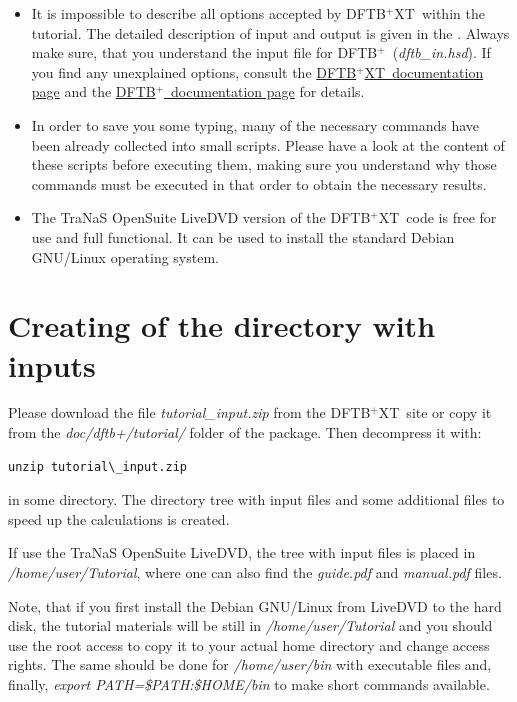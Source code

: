 \documentclass[a4paper,11pt,english]{sphinxmanual}
\newcommand{\dftbp}{\textsf{DFTB$^{\text{+}}$\ }} %
\newcommand{\dftbpxt}{\textsf{DFTB$^{\text{+}}$XT\ }} %
\newcommand{\is}[1]{{\sffamily{#1}}}
\begin{document}
{{\begin{itemize}
\item {} 
It is impossible to describe all options accepted by \dftbpxt within
the tutorial. The detailed description of input and output is given in the \is{USER MANUAL}.
Always make sure, that you understand the input file
for \dftbp (\emph{dftb\_in.hsd}). If you find any unexplained options,
consult the \href{http://tranas.org/opensuite/documentation.html}{\dftbpxt documentation page} and the \href{http://www.dftbplus.org/documentation/}{\dftbp documentation page} for details.

\item {} 
In order to save you some typing, many of the necessary commands
have been already collected into small scripts. Please have a look
at the content of these scripts before executing them, making sure
you understand why those commands must be executed in that order to
obtain the necessary results.

\item {} 
The {\textsf{TraNaS OpenSuite LiveDVD}} version of the \dftbpxt code is free for use and full functional.
It can be used to install the standard Debian GNU/Linux operating system.

\end{itemize}

\section{Creating of the directory with inputs}

Please download the file \emph{tutorial\_input.zip} from the \dftbpxt site or copy it from the \emph{doc/dftb+/tutorial/} folder of the package. Then decompress it with:
%
\begin{Verbatim}[commandchars=\\\{\}]
unzip tutorial\_input.zip
\end{Verbatim}

in some directory. The directory tree with input files and some additional files to speed up the calculations is created.

\null
If use the {\textsf{TraNaS OpenSuite LiveDVD}}, the tree with input files is placed in \emph{/home/user/Tutorial}, where one can also find the \emph{guide.pdf} and \emph{manual.pdf} files.

\null
Note, that if you first install the Debian GNU/Linux from LiveDVD to the hard disk, the tutorial materials will be still in \emph{/home/user/Tutorial} and you should use the root access to copy it to your actual home directory and change access rights. The same should be done for \emph{/home/user/bin} with executable files and, finally, \emph{export PATH=\$PATH:\$HOME/bin} to make short commands available.

}}
\end{document}
